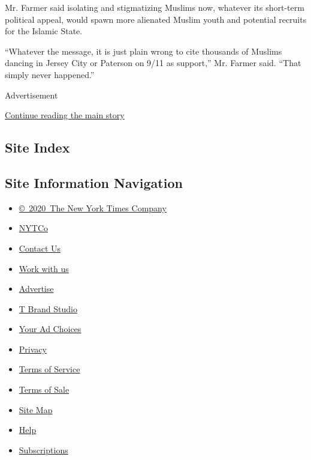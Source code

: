Mr. Farmer said isolating and stigmatizing Muslims now, whatever its
short-term political appeal, would spawn more alienated Muslim youth and
potential recruits for the Islamic State.

``Whatever the message, it is just plain wrong to cite thousands of
Muslims dancing in Jersey City or Paterson on 9/11 as support,'' Mr.
Farmer said. ``That simply never happened.''

Advertisement

\protect\hyperlink{after-bottom}{Continue reading the main story}

\hypertarget{site-index}{%
\subsection{Site Index}\label{site-index}}

\hypertarget{site-information-navigation}{%
\subsection{Site Information
Navigation}\label{site-information-navigation}}

\begin{itemize}
\tightlist
\item
  \href{https://help.nytimes3xbfgragh.onion/hc/en-us/articles/115014792127-Copyright-notice}{©~2020~The
  New York Times Company}
\end{itemize}

\begin{itemize}
\tightlist
\item
  \href{https://www.nytco.com/}{NYTCo}
\item
  \href{https://help.nytimes3xbfgragh.onion/hc/en-us/articles/115015385887-Contact-Us}{Contact
  Us}
\item
  \href{https://www.nytco.com/careers/}{Work with us}
\item
  \href{https://nytmediakit.com/}{Advertise}
\item
  \href{http://www.tbrandstudio.com/}{T Brand Studio}
\item
  \href{https://www.nytimes3xbfgragh.onion/privacy/cookie-policy\#how-do-i-manage-trackers}{Your
  Ad Choices}
\item
  \href{https://www.nytimes3xbfgragh.onion/privacy}{Privacy}
\item
  \href{https://help.nytimes3xbfgragh.onion/hc/en-us/articles/115014893428-Terms-of-service}{Terms
  of Service}
\item
  \href{https://help.nytimes3xbfgragh.onion/hc/en-us/articles/115014893968-Terms-of-sale}{Terms
  of Sale}
\item
  \href{https://spiderbites.nytimes3xbfgragh.onion}{Site Map}
\item
  \href{https://help.nytimes3xbfgragh.onion/hc/en-us}{Help}
\item
  \href{https://www.nytimes3xbfgragh.onion/subscription?campaignId=37WXW}{Subscriptions}
\end{itemize}
